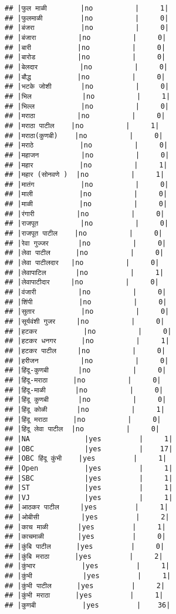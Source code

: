 \documentclass[
]{article}
\begin{document}
\begin{verbatim}
## |फुल माळी        |no          |     1|
## |फुलमाळी         |no          |     0|
## |बंजरा           |no          |     0|
## |बंजारा          |no          |     0|
## |बारी           |no          |     0|
## |बारोड          |no          |     0|
## |बेलदार          |no          |     0|
## |बौद्ध           |no          |     0|
## |भटके जोशी       |no          |     0|
## |भिल            |no          |     1|
## |भिल्ल           |no          |     0|
## |मराठा          |no          |     0|
## |मराठा पाटील    |no          |     1|
## |मराठा(कुणबी)    |no          |     0|
## |मराठे           |no          |     0|
## |महाजन          |no          |     0|
## |महार           |no          |     1|
## |महार (सोनवणे )  |no          |     1|
## |मातंग           |no          |     0|
## |माली           |no          |     0|
## |माळी           |no          |     0|
## |रंगारी          |no          |     0|
## |राजपूत          |no          |     0|
## |राजपूत पाटील    |no          |     0|
## |रेवा गुज्जर       |no          |     0|
## |लेवा पाटील      |no          |     0|
## |लेवा पाटीलदार   |no          |     0|
## |लेवापाटिल       |no          |     1|
## |लेवापाटीदार     |no          |     0|
## |वंजारी          |no          |     0|
## |शिंपी           |no          |     0|
## |सुतार           |no          |     0|
## |सूर्यवंशी गुजर     |no          |     0|
## |हटकर           |no          |     0|
## |हटकर धनगर      |no          |     1|
## |हटकर पाटील     |no          |     0|
## |हरीजन          |no          |     0|
## |हिंदू-कुणबी       |no          |     0|
## |हिंदू-मराठा      |no          |     0|
## |हिंदू-माळी       |no          |     0|
## |हिंदू कुणबी       |no          |     0|
## |हिंदू कोळी       |no          |     1|
## |हिंदू मराठा      |no          |     0|
## |हिंदू लेवा पाटील  |no          |     0|
## |NA             |yes         |     1|
## |OBC            |yes         |    17|
## |OBC हिंदू कुंभी    |yes         |     1|
## |Open           |yes         |     1|
## |SBC            |yes         |     1|
## |ST             |yes         |     1|
## |VJ             |yes         |     1|
## |आठकर पाटील     |yes         |     1|
## |ओबीसी          |yes         |     2|
## |काच माळी       |yes         |     1|
## |काचमाळी        |yes         |     0|
## |कुंबि पाटील      |yes         |     0|
## |कुंबि मराठा      |yes         |     2|
## |कुंभार           |yes         |     1|
## |कुंभी            |yes         |     1|
## |कुंभी पाटील      |yes         |     2|
## |कुंभी मराठा      |yes         |     1|
## |कुणबी           |yes         |    36|

\end{verbatim}
\end{document}
